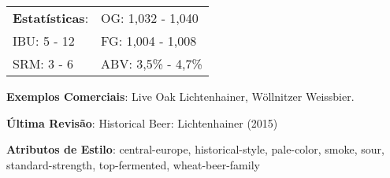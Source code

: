 \begin{tabular}{@{}p{35mm}p{35mm}@{}}
  \textbf{Estatísticas}: & OG: 1,032 - 1,040  \\
  IBU: 5 - 12  & FG: 1,004 - 1,008  \\
  SRM: 3 - 6 & ABV: 3,5\% - 4,7\%
\end{tabular}

\textbf{Exemplos Comerciais}: Live Oak Lichtenhainer, Wöllnitzer Weissbier.

\textbf{Última Revisão}: Historical Beer: Lichtenhainer (2015)

\textbf{Atributos de Estilo}: central-europe, historical-style, pale-color, smoke, sour, standard-strength, top-fermented, wheat-beer-family